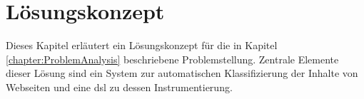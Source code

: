 \chapter{Lösungskonzept}
    \label{chapter:SolutionConcept}
    Dieses Kapitel erläutert ein Lösungskonzept für die in Kapitel \ref{chapter:ProblemAnalysis} beschriebene Problemstellung.
    Zentrale Elemente dieser Lösung sind ein System zur automatischen Klassifizierung der Inhalte von Webseiten
    und eine \gls{dsl} zu dessen Instrumentierung.

    
    
    
    
    
    
    
    
    
